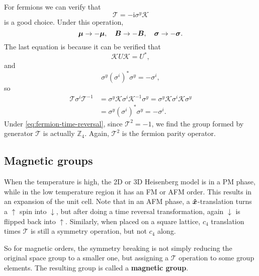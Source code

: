 \documentclass[hyperref, a4paper]{article}
\newcommand*{\ii}{\mathrm{i}}
\newcommand*{\concept}[1]{{\textbf{#1}}}
\begin{document}
For fermions we can verify that 
\begin{equation}
    \mathcal{T} = - \ii \sigma^y \mathcal{K}
    \label{eq:fermion-time-reversal}
\end{equation}
is a good choice. Under this operation, 
\[
    \vb*{\mu} \to - \vb*{\mu}, \quad \vb*{B} \to - \vb*{B}, \quad \vb*{\sigma} \to - \vb*{\sigma}.
\]
The last equation is because it can be verified that 
\begin{equation}
    \mathcal{K} U \mathcal{K} = U^*,
\end{equation}
and 
\begin{equation}
    \sigma^y (\sigma^i)^* \sigma^y = - \sigma^i,
\end{equation}
so
\[
    \begin{aligned}
        \mathcal{T} \sigma^i \mathcal{T}^{-1} &= \sigma^y \mathcal{K} \sigma^i \mathcal{K}^{-1} \sigma^y = \sigma^y \mathcal{K} \sigma^i \mathcal{K} \sigma^y  \\
        &= \sigma^y (\sigma^i)^* \sigma^y = - \sigma^i.
    \end{aligned}
\]
Under \eqref{eq:fermion-time-reversal}, since $\mathcal{T}^2 = -1$, we find the group formed by generator $\mathcal{T}$
is actually $\mathbb{Z}_4$. 
Again, $\mathcal{T}^2$ is the fermion parity operator.

\subsection{Magnetic groups}

When the temperature is high, the 2D or 3D Heisenberg model is in a PM phase, while in the low temperature 
region it has an FM or AFM order. This results in an expansion of the unit cell. Note that in an AFM
phase, a $\vu*{x}$-translation turns a $\uparrow$ spin into $\downarrow$, but after doing a time reversal 
transformation, again $\downarrow$ is flipped back into $\uparrow$. Similarly, when placed on a square lattice, 
$c_4$ translation times $\mathcal{T}$ is still a symmetry operation, but not $c_4$ along.

So for magnetic orders, the symmetry breaking is not simply reducing the original space group to a smaller 
one, but assigning a $\mathcal{T}$ operation to some group elements. The resulting group is called 
a \concept{magnetic group}. 
\end{document}

